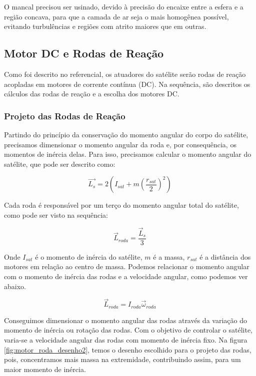 O mancal precisou ser usinado, devido à precisão do encaixe entre a esfera e a região concava, para que a camada de ar seja o mais homogênea possível, evitando turbulências e regiões com atrito maiores que em outras. 



\subsection{Motor DC e Rodas de Reação}

Como foi descrito no referencial, os atuadores do satélite serão rodas de reação acopladas em motores de corrente contínua (DC). Na sequência, são descritos os cálculos das rodas de reação e a escolha dos motores DC. 


\subsubsection{Projeto das Rodas de Reação}

Partindo do princípio da conservação do momento angular do corpo do satélite, precisamos dimensionar o momento angular da roda e, por consequência, os momentos de inércia delas. Para isso, precisamos calcular o momento angular do satélite, que pode ser descrito como:

\begin{equation}
\vec{L_s} = 2\left(I_{sat} + m\left(\frac{r_{sat}}{2}\right)^2\right)  
\end{equation}

Cada roda é responsável por um terço do momento angular total do satélite, como pode ser visto na sequência:

\begin{equation}
\vec{L}_{roda} = \frac{\vec{L}_s}{3}   
\end{equation}

Onde $I_{sat}$ é o momento de inércia do satélite, $m$ é a massa, $r_{sat}$ é a distância dos motores em relação ao centro de massa. Podemos relacionar o momento angular com o momento de inércia das rodas e a velocidade angular, como podemos ver abaixo.

\begin{equation}
\vec{L}_{roda} = I_{roda}\vec{\omega}_{roda}
\end{equation}

Conseguimos dimensionar o momento angular das rodas através da variação do momento de inércia ou rotação das rodas. Com o objetivo de controlar o satélite, varia-se a velocidade angular das rodas com momento de inércia fixo. Na figura \ref{fig:motor_roda_desenho2}, temos o desenho escolhido para o projeto das rodas, pois, concentramos mais massa na extremidade, contribuindo assim, para um maior momento de inércia.

